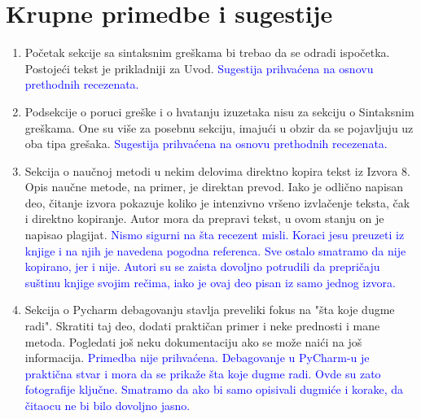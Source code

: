 \documentclass[a4paper]{report}
\newcommand{\odgovor}[1]{\textcolor{blue}{#1}}
\begin{document}
\section{Krupne primedbe i sugestije}
\begin{enumerate}
\item Početak sekcije sa sintaksnim greškama bi trebao da se odradi ispočetka. Postojeći tekst je prikladniji za Uvod.
\odgovor{Sugestija prihvaćena na osnovu prethodnih recezenata.}
\item Podsekcije o poruci greške i o hvatanju izuzetaka nisu za sekciju o Sintaksnim greškama. One su više za posebnu sekciju, imajući u obzir da se pojavljuju uz oba tipa grešaka. 
\odgovor{Sugestija prihvaćena na osnovu prethodnih recezenata.}
\item Sekcija o naučnoj metodi u nekim delovima direktno kopira tekst iz Izvora 8. Opis naučne metode, na primer, je direktan prevod. Iako je odlično napisan deo, čitanje izvora pokazuje koliko je intenzivno vršeno izvlačenje teksta, čak i direktno kopiranje. Autor mora da prepravi tekst, u ovom stanju on je napisao plagijat.
\odgovor{Nismo sigurni na šta recezent misli. Koraci jesu preuzeti iz knjige i na njih je navedena pogodna referenca. Sve ostalo smatramo da nije kopirano, jer i nije. Autori su se zaista dovoljno potrudili da prepričaju suštinu knjige svojim rečima, iako je ovaj deo pisan iz samo jednog izvora.}
\item Sekcija o Pycharm debagovanju stavlja preveliki fokus na "šta koje dugme radi". Skratiti taj deo, dodati praktičan primer i neke prednosti i mane metoda. Pogledati još neku dokumentaciju ako se može naići na još informacija.
\odgovor{Primedba nije prihvaćena. Debagovanje u PyCharm-u je praktična stvar i  mora da se prikaže šta koje dugme radi. Ovde su zato fotografije ključne. Smatramo da ako bi samo opisivali dugmiće i korake, da čitaocu ne bi bilo dovoljno jasno.}
\end{enumerate}
\end{document}
